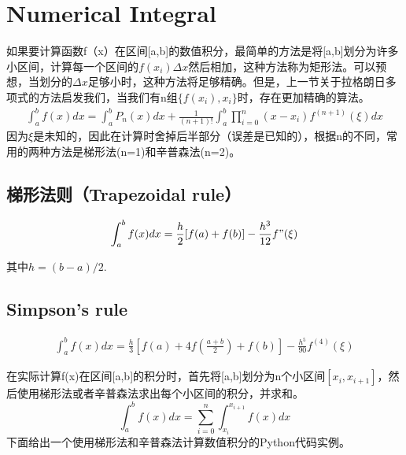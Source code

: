 \section{Numerical Integral}
如果要计算函数f（x）在区间[a,b]的数值积分，最简单的方法是将[a,b]划分为许多小区间，计算每一个区间的$f(x_i)\Delta x$然后相加，这种方法称为矩形法。可以预想，当划分的$\Delta x$足够小时，这种方法将足够精确。但是，上一节关于拉格朗日多项式的方法启发我们，当我们有n组$\{f(x_i),x_i\}$时，存在更加精确的算法。
\begin{align}
    \int_{a}^{b}f(x)dx=\int_{a}^{b}P_n(x)dx+\frac{1}{(n+1)!}\int_{a}^{b}\prod_{i=0}^{n}(x-x_i)f^{(n+1)}(\xi)dx
\end{align}
因为$\xi$是未知的，因此在计算时舍掉后半部分（误差是已知的），根据n的不同，常用的两种方法是梯形法(n=1)和辛普森法(n=2)。
\subsection{梯形法则（Trapezoidal rule）}
\begin{tauenv}[frametitle=Trapezoidal rule]
    \begin{align}
    \int_{a}^{b}f(x)dx=\frac{h}{2}[f(a)+f(b)]-\frac{h^3}{12}f"(\xi)
    \end{align}
\end{tauenv}
其中$h=(b-a)/2$.
\subsection{Simpson's rule}
\begin{tauenv}[frametitle=Simpson's rule]
    \begin{align}
    \int_{a}^{b}f(x)dx=\frac{h}{3}[f(a)+4f(\frac{a+b}{2})+f(b)]-\frac{h^5}{90}f^{(4)}(\xi)
    \end{align}
\end{tauenv}
在实际计算f(x)在区间[a,b]的积分时，首先将[a,b]划分为n个小区间$[x_i,x_{i+1}]$，然后使用梯形法或者辛普森法求出每个小区间的积分，并求和。
\begin{equation*}
    \int_{a}^{b}f(x)dx=\sum_{i=0}^{n}\int_{x_i}^{x_{i+1}}f(x)dx
\end{equation*}
下面给出一个使用梯形法和辛普森法计算数值积分的Python代码实例。
